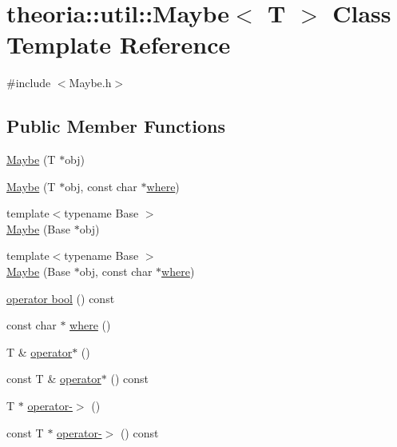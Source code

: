\hypertarget{classtheoria_1_1util_1_1Maybe}{}\section{theoria\+:\+:util\+:\+:Maybe$<$ T $>$ Class Template Reference}
\label{classtheoria_1_1util_1_1Maybe}


{\ttfamily \#include $<$Maybe.\+h$>$}

\subsection*{Public Member Functions}
\begin{DoxyCompactItemize}
\item 
\hyperlink{classtheoria_1_1util_1_1Maybe_aff51836d12cb53b458316be21391e847}{Maybe} (T $\ast$obj)
\item 
\hyperlink{classtheoria_1_1util_1_1Maybe_a20f1e97e3620fed19c579ffdc9063bf8}{Maybe} (T $\ast$obj, const char $\ast$\hyperlink{classtheoria_1_1util_1_1Maybe_a2dbc83104aa3cac55f043e468ef3e86f}{where})
\item 
{\footnotesize template$<$typename Base $>$ }\\\hyperlink{classtheoria_1_1util_1_1Maybe_a077b3ce153debaf6adb797ebf494745b}{Maybe} (Base $\ast$obj)
\item 
{\footnotesize template$<$typename Base $>$ }\\\hyperlink{classtheoria_1_1util_1_1Maybe_a955e6b90184ad9e054038ebbd8dab3c6}{Maybe} (Base $\ast$obj, const char $\ast$\hyperlink{classtheoria_1_1util_1_1Maybe_a2dbc83104aa3cac55f043e468ef3e86f}{where})
\item 
\hyperlink{classtheoria_1_1util_1_1Maybe_aa88cfe148c9279e1ed6de5ed145d6e23}{operator bool} () const
\item 
const char $\ast$ \hyperlink{classtheoria_1_1util_1_1Maybe_a2dbc83104aa3cac55f043e468ef3e86f}{where} ()
\item 
T \& \hyperlink{classtheoria_1_1util_1_1Maybe_abe504b965167614138072fe5d227f3f6}{operator$\ast$} ()
\item 
const T \& \hyperlink{classtheoria_1_1util_1_1Maybe_a9000a809c918d529a2462e1d53ac138d}{operator$\ast$} () const
\item 
T $\ast$ \hyperlink{classtheoria_1_1util_1_1Maybe_ae85df3b0214529075af8010ed943ae83}{operator-\/$>$} ()
\item 
const T $\ast$ \hyperlink{classtheoria_1_1util_1_1Maybe_a064989af954077e2817c1c4c0bf8d87f}{operator-\/$>$} () const

\end{DoxyCompactItemize}

